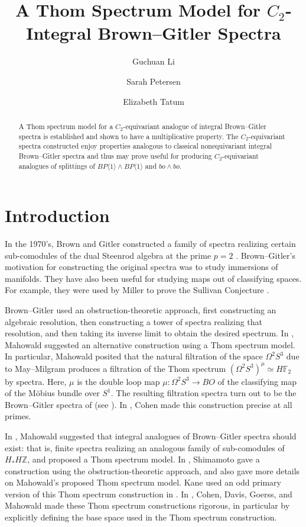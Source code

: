 \documentclass[]{amsart}  %
\title{A Thom Spectrum Model for $C_2$-Integral Brown--Gitler Spectra}
\author{Guchuan Li \and Sarah Petersen \and Elizabeth Tatum}
\theoremstyle{definition}
\numberwithin{equation}{section}
\numberwithin{figure}{section}
\newcommand{\mF}{{\mathbb F}}
\newcommand{\0}{\langle 0 \rangle}
\begin{document}
	
	\begin{abstract}
	A Thom spectrum model for a $C_2$-equivariant 
        analogue of integral Brown--Gitler spectra is established and shown to have a multiplicative property. The $C_2$-equivariant spectra constructed enjoy properties analogous to classical nonequivariant integral Brown--Gitler spectra and thus may prove useful for producing $C_2$-equivariant analogues of splittings of $BP \langle 1 \rangle \wedge BP \langle 1 \rangle$ and $bo \wedge bo.$
	\end{abstract} 
	
	\maketitle
        \tableofcontents
	
\section{Introduction}

In the 1970's, Brown and Gitler constructed a family of spectra realizing certain sub-comodules of the dual Steenrod algebra at the prime $p=2$ \cite{brown1973spectrum}. Brown--Gitler's motivation for constructing the original spectra was to study immersions of manifolds. They have also been useful for studying maps out of classifying spaces. For example, they were used by Miller to prove the Sullivan Conjecture \cite{miller1984sullivan}. 
  
Brown--Gitler used an obstruction-theoretic approach, first constructing an algebraic resolution, then constructing a tower of spectra realizing that resolution, and then taking its inverse limit to obtain the desired spectrum. In \cite{Mahowald1977}, Mahowald suggested an alternative construction using a Thom spectrum model. In particular, Mahowald posited that the natural filtration of the space $\Omega^2 S^3$ due to May--Milgram \cite{MilMay81} produces a filtration of the Thom spectrum $(\Omega^2 S^3)^\mu \simeq H {\mF}_2$ by spectra. Here, $\mu$ is the double loop map 
$\mu: \Omega^2 S^3 \to BO$ of the classifying map of the M\"{o}bius bundle over $S^1.$ The resulting filtration spectra turn out to be the Brown--Gitler spectra of \cite{brown1973spectrum} (see \cite{BP78,cohen1979geometry,HuntKuhn99}). In \cite{cohen1979geometry}, Cohen made this construction precise at all primes. 

In \cite{mahowald1981bo}, Mahowald suggested that integral analogues of Brown--Gitler spectra should exist: that is, finite spectra realizing an analogous family of sub-comodules of $H_{*}H\mathbb{Z}$, and proposed a Thom spectrum model. In \cite{shimamoto1984integral}, Shimamoto gave a construction using the obstruction-theoretic approach, and also gave more details on Mahowald's proposed Thom spectrum model. Kane used an odd primary version of this Thom spectrum construction in \cite{kane1981operations}. In \cite{CDGM1988}, Cohen, Davis, Goerss, and Mahowald made these Thom spectrum constructions rigorous, in particular by explicitly defining the base space used in the Thom spectrum construction. 
\end{document}
